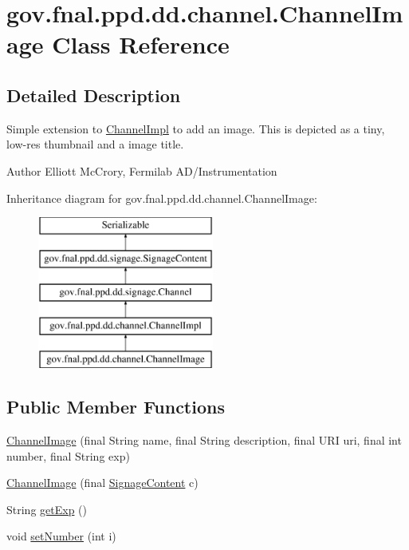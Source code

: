 \hypertarget{classgov_1_1fnal_1_1ppd_1_1dd_1_1channel_1_1ChannelImage}{\section{gov.\-fnal.\-ppd.\-dd.\-channel.\-Channel\-Image Class Reference}
\label{classgov_1_1fnal_1_1ppd_1_1dd_1_1channel_1_1ChannelImage}
}


\subsection{Detailed Description}
Simple extension to \hyperlink{classgov_1_1fnal_1_1ppd_1_1dd_1_1channel_1_1ChannelImpl}{Channel\-Impl} to add an image. This is depicted as a tiny, low-\/res thumbnail and a image title.

\begin{DoxyAuthor}{Author}
Elliott Mc\-Crory, Fermilab A\-D/\-Instrumentation 
\end{DoxyAuthor}
Inheritance diagram for gov.\-fnal.\-ppd.\-dd.\-channel.\-Channel\-Image\-:\begin{figure}[H]
\begin{center}
\leavevmode
\includegraphics[height=5.000000cm]{classgov_1_1fnal_1_1ppd_1_1dd_1_1channel_1_1ChannelImage}
\end{center}
\end{figure}
\subsection*{Public Member Functions}
\begin{DoxyCompactItemize}
\item 
\hyperlink{classgov_1_1fnal_1_1ppd_1_1dd_1_1channel_1_1ChannelImage_ab18718b659f333b1858606312779339c}{Channel\-Image} (final String name, final String description, final U\-R\-I uri, final int number, final String exp)
\item 
\hyperlink{classgov_1_1fnal_1_1ppd_1_1dd_1_1channel_1_1ChannelImage_a5e00f8dc7d13b8d9186dbbea54f5205a}{Channel\-Image} (final \hyperlink{interfacegov_1_1fnal_1_1ppd_1_1dd_1_1signage_1_1SignageContent}{Signage\-Content} c)
\item 
String \hyperlink{classgov_1_1fnal_1_1ppd_1_1dd_1_1channel_1_1ChannelImage_a3b35ca4da6e88f0f2f2e18fd2c4be85e}{get\-Exp} ()
\item 
void \hyperlink{classgov_1_1fnal_1_1ppd_1_1dd_1_1channel_1_1ChannelImage_ae2edd21f7326063ec9aa3f0828c4398b}{set\-Number} (int i)
\end{DoxyCompactItemize}
